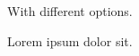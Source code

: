 \documentclass{article}
\begin{document}
{With different options.}

Lorem ipsum  dolor sit.




\end{document}
